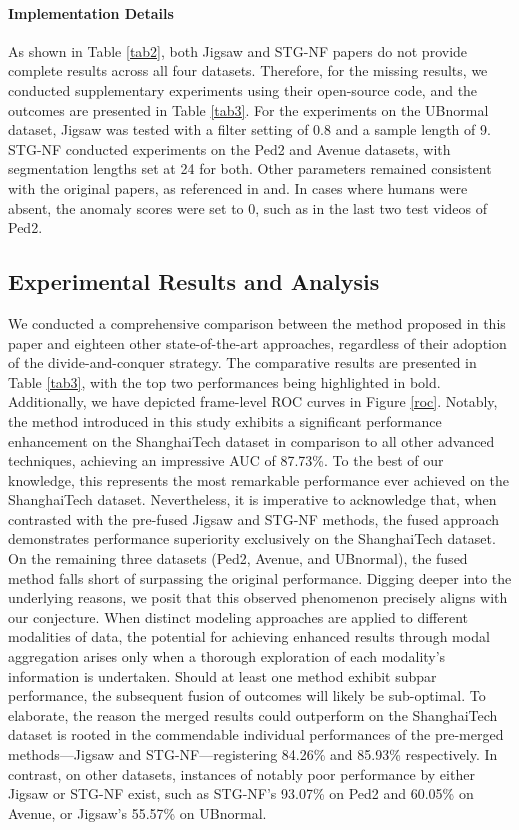 \documentclass[conference]{IEEEtran}
\begin{document}
\paragraph{Implementation Details}
As shown in Table \ref{tab2}, both Jigsaw and STG-NF papers do not provide complete results across all four datasets. Therefore, for the missing results, we conducted supplementary experiments using their open-source code, and the outcomes are presented in Table \ref{tab3}. For the experiments on the UBnormal dataset, Jigsaw was tested with a filter setting of 0.8 and a sample length of 9. STG-NF conducted experiments on the Ped2 and Avenue datasets, with segmentation lengths set at 24 for both. Other parameters remained consistent with the original papers, as referenced in\cite{jigsaw} and\cite{STG-NF}. In cases where humans were absent, the anomaly scores were set to 0, such as in the last two test videos of Ped2.


\subsection{Experimental Results and Analysis}
We conducted a comprehensive comparison between the method proposed in this paper and eighteen other state-of-the-art approaches, regardless of their adoption of the divide-and-conquer strategy. The comparative results are presented in Table \ref{tab3}, with the top two performances being highlighted in bold. Additionally, we have depicted frame-level ROC curves in Figure \ref{roc}. Notably, the method introduced in this study exhibits a significant performance enhancement on the ShanghaiTech dataset in comparison to all other advanced techniques, achieving an impressive AUC of 87.73\%. To the best of our knowledge, this represents the most remarkable performance ever achieved on the ShanghaiTech dataset. Nevertheless, it is imperative to acknowledge that, when contrasted with the pre-fused Jigsaw and STG-NF methods, the fused approach demonstrates performance superiority exclusively on the ShanghaiTech dataset. On the remaining three datasets (Ped2, Avenue, and UBnormal), the fused method falls short of surpassing the original performance. Digging deeper into the underlying reasons, we posit that this observed phenomenon precisely aligns with our conjecture. When distinct modeling approaches are applied to different modalities of data, the potential for achieving enhanced results through modal aggregation arises only when a thorough exploration of each modality's information is undertaken. Should at least one method exhibit subpar performance, the subsequent fusion of outcomes will likely be sub-optimal. To elaborate, the reason the merged results could outperform on the ShanghaiTech dataset is rooted in the commendable individual performances of the pre-merged methods—Jigsaw and STG-NF—registering 84.26\% and 85.93\% respectively. In contrast, on other datasets, instances of notably poor performance by either Jigsaw or STG-NF exist, such as STG-NF's 93.07\% on Ped2 and 60.05\% on Avenue, or Jigsaw's 55.57\% on UBnormal.
\end{document}
